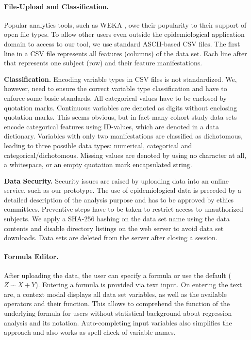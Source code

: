 \documentclass[journal]{style/vgtc} 			          %
\begin{document}
\paragraph{File-Upload and Classification.}
Popular analytics tools, such as WEKA \cite{WEKA}, owe their popularity to their support of open file types.
To allow other users even outside the epidemiological application domain to access to our tool, we use standard ASCII-based CSV files.
The first line in a CSV file represents all features (columns) of the data set.
Each line after that represents one subject (row) and their feature manifestations.

\textbf{Classification.}
Encoding variable types in CSV files is not standardized.
We, however, need to ensure the correct variable type classification and have to enforce some basic standards.
All categorical values have to be enclosed by quotation marks.
Continuous variables are denoted as digits without enclosing quotation marks.
This seems obvious, but in fact many cohort study data sets encode categorical features using ID-values, which are denoted in a data dictionary.
Variables with only two manifestations are classified as dichotomous, leading to three possible data types: numerical, categorical and categorical/dichotomous.
Missing values are denoted by using no character at all, a whitespace, or an empty quotation mark encapsulated string.

\textbf{Data Security.}
Security issues are raised by uploading data into an online service, such as our prototype.
The use of epidemiological data is preceded by a detailed description of the analysis purpose and has to be approved by ethics committees.
Preventive steps have to be taken to restrict access to unauthorized subjects.
We apply a SHA-256 hashing on the data set name using the data contents and disable directory listings on the web server to avoid data set downloads.
Data sets are deleted from the server after closing a session.

\paragraph{Formula Editor.}
After uploading the data, the user can specify a formula or use the default ($Z \sim X + Y$).
Entering a formula is provided via text input.
On entering the text are, a context modal displays all data set variables, as well as the available operators and their function.
This allows to comprehend the function of the underlying formula for users without statistical background about regression analysis and its notation.
Auto-completing input variables also simplifies the approach and also works as spell-check of variable names.
\end{document}

